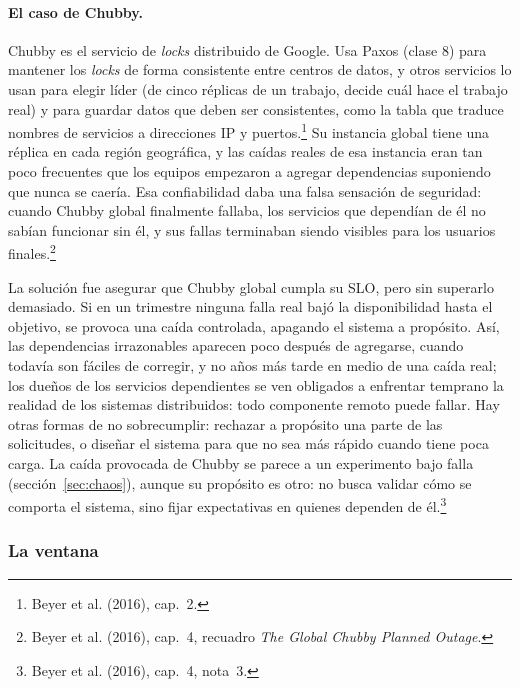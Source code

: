 \documentclass[variant=apuntes,cover=institutional,mode=screen]{ua-engineering-v6-article}
\begin{document}
\paragraph{El caso de Chubby.} Chubby es el servicio de \emph{locks} distribuido de Google. Usa Paxos (clase 8) para mantener los \emph{locks} de forma consistente entre centros de datos, y otros servicios lo usan para elegir líder (de cinco réplicas de un trabajo, decide cuál hace el trabajo real) y para guardar datos que deben ser consistentes, como la tabla que traduce nombres de servicios a direcciones IP y puertos.\footnote{Beyer et al. (2016), cap.~2.} Su instancia global tiene una réplica en cada región geográfica, y las caídas reales de esa instancia eran tan poco frecuentes que los equipos empezaron a agregar dependencias suponiendo que nunca se caería. Esa confiabilidad daba una falsa sensación de seguridad: cuando Chubby global finalmente fallaba, los servicios que dependían de él no sabían funcionar sin él, y sus fallas terminaban siendo visibles para los usuarios finales.\footnote{Beyer et al. (2016), cap.~4, recuadro \emph{The Global Chubby Planned Outage}.}

La solución fue asegurar que Chubby global cumpla su SLO, pero sin superarlo demasiado. Si en un trimestre ninguna falla real bajó la disponibilidad hasta el objetivo, se provoca una caída controlada, apagando el sistema a propósito. Así, las dependencias irrazonables aparecen poco después de agregarse, cuando todavía son fáciles de corregir, y no años más tarde en medio de una caída real; los dueños de los servicios dependientes se ven obligados a enfrentar temprano la realidad de los sistemas distribuidos: todo componente remoto puede fallar. Hay otras formas de no sobrecumplir: rechazar a propósito una parte de las solicitudes, o diseñar el sistema para que no sea más rápido cuando tiene poca carga. La caída provocada de Chubby se parece a un experimento bajo falla (sección~\ref{sec:chaos}), aunque su propósito es otro: no busca validar cómo se comporta el sistema, sino fijar expectativas en quienes dependen de él.\footnote{Beyer et al. (2016), cap.~4, nota~3.}

\subsubsection{La ventana}
\end{document}
